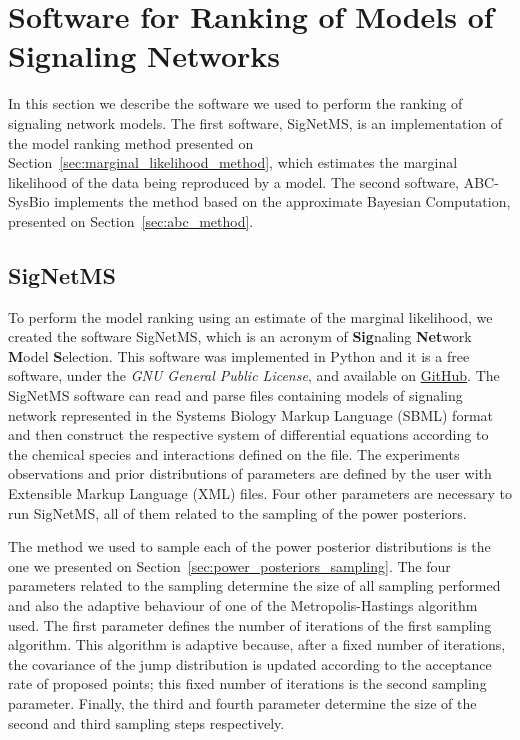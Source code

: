 \section{Software for Ranking of Models of Signaling Networks}
In this section we describe the software we used to perform the ranking
of signaling network models. The first software, SigNetMS, is an 
implementation of the model ranking method presented on 
Section~\ref{sec:marginal_likelihood_method}, which estimates the 
marginal likelihood of the data being reproduced by a model.  The second 
software, ABC-SysBio implements the method based on the approximate 
Bayesian Computation, presented on Section~\ref{sec:abc_method}.

\subsection{SigNetMS}
To perform the model ranking using an estimate of the marginal 
likelihood, we created the software SigNetMS, which is an acronym of 
{\bf Sig}naling {\bf Net}work {\bf M}odel {\bf S}election. This software
was implemented in Python and it is a free software, under the \emph{GNU 
General Public License}, and available on
\href{https://github.com/gustavoem/SigNetMS}{GitHub}. The SigNetMS 
software can read and parse files containing models of signaling network 
represented in the Systems Biology Markup Language (SBML) format and 
then construct the respective system of differential equations according 
to the chemical species and interactions defined on the file. The 
experiments observations and prior distributions of parameters are 
defined by the user with Extensible Markup Language (XML) files. Four 
other parameters are necessary to run SigNetMS, all of them related to 
the sampling of the power posteriors. 

The method we used to sample each of the power posterior distributions
is the one we presented on Section~\ref{sec:power_posteriors_sampling}.
The four parameters related to the sampling determine the size of all
sampling  performed and also the adaptive behaviour of one of the 
Metropolis-Hastings algorithm used. The first parameter defines the 
number of iterations of the first sampling algorithm. This algorithm is 
adaptive because, after a fixed number of iterations, the covariance of 
the jump distribution is updated according to the acceptance rate of 
proposed points; this fixed number of iterations is the second sampling 
parameter. Finally, the third and fourth parameter determine the size of
the second and third sampling steps respectively.

